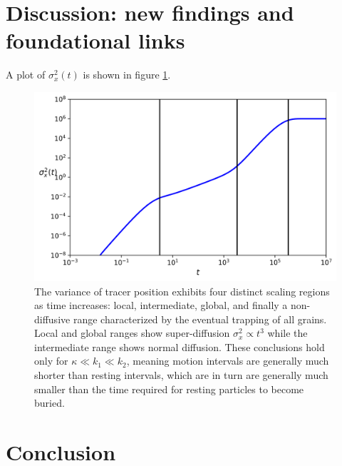 \documentclass[]{agujournal2018}
\begin{document}
\section{Discussion: new findings and foundational links}
A plot of $\sigma_x^2(t)$ is shown in figure \ref{fig:var}.
\begin{figure}
	\includegraphics[width=\linewidth,keepaspectratio]{./figures/diffusion.png}
	\caption{The variance of tracer position exhibits four distinct scaling regions as time increases: local, intermediate, global, and finally a non-diffusive range characterized by the eventual trapping of all grains.
	Local and global ranges show super-diffusion $\sigma_x^2 \propto t^3$ while the intermediate range shows normal diffusion. These conclusions hold only for $\kappa \ll k_1 \ll k_2$, meaning motion intervals are generally much shorter than resting intervals, which are in turn are generally much smaller than the time required for resting particles to become buried.}
	\label{fig:var}
\end{figure}


\section{Conclusion}


\appendix
\end{document}
